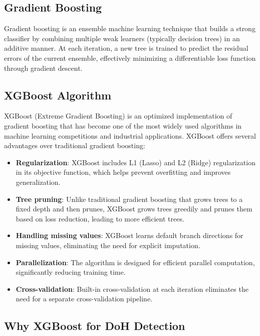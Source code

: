 \documentclass[../Main.tex]{subfiles}
\begin{document}
\subsection{Gradient Boosting}

Gradient boosting is an ensemble machine learning technique that builds a strong classifier by combining multiple weak learners (typically decision trees) in an additive manner. At each iteration, a new tree is trained to predict the residual errors of the current ensemble, effectively minimizing a differentiable loss function through gradient descent.

\subsection{XGBoost Algorithm}

XGBoost (Extreme Gradient Boosting) \cite{chen2016xgboost} is an optimized implementation of gradient boosting that has become one of the most widely used algorithms in machine learning competitions and industrial applications. XGBoost offers several advantages over traditional gradient boosting:

\begin{itemize}
    \item \textbf{Regularization}: XGBoost includes L1 (Lasso) and L2 (Ridge) regularization in its objective function, which helps prevent overfitting and improves generalization.
    \item \textbf{Tree pruning}: Unlike traditional gradient boosting that grows trees to a fixed depth and then prunes, XGBoost grows trees greedily and prunes them based on loss reduction, leading to more efficient trees.
    \item \textbf{Handling missing values}: XGBoost learns default branch directions for missing values, eliminating the need for explicit imputation.
    \item \textbf{Parallelization}: The algorithm is designed for efficient parallel computation, significantly reducing training time.
    \item \textbf{Cross-validation}: Built-in cross-validation at each iteration eliminates the need for a separate cross-validation pipeline.
\end{itemize}

\subsection{Why XGBoost for DoH Detection}
\end{document}
